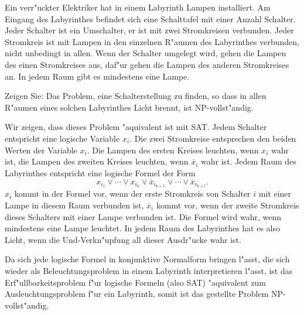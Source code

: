 Ein verr"uckter Elektriker hat in einem Labyrinth Lampen installiert.
Am Eingang des Labyrinthes befindet sich eine Schalttafel mit einer
Anzahl Schalter. Jeder Schalter ist ein Umschalter, er ist mit
zwei Stromkreisen verbunden. Jeder Stromkreis ist mit Lampen in
den einzelnen R"aumen des Labyrinthes verbunden, nicht unbedingt in
allen.
Wenn der
Schalter umgelegt wird, gehen die Lampen des einen
Stromkreises aus, daf"ur gehen die Lampen des anderen Stromkreises an.
In jedem Raum gibt es mindestens eine Lampe.

Zeigen Sie: Das Problem, eine Schalterstellung zu finden, so
dass in allen R"aumen eines solchen Labyrinthes Licht brennt,
ist NP-vollst"andig.

\begin{loesung}
Wir zeigen, dass dieses Problem "aquivalent ist mit SAT. Jedem Schalter
entspricht eine logische Variable $x_i$. Die zwei Stromkreise entsprechen
den beiden Werten der Variable $x_i$. Die Lampen des ersten Kreises leuchten,
wenn $x_i$ wahr ist, die Lampen des zweiten Kreises leuchten, wenn
$\overline x_i$ wahr ist.
Jedem Raum des Labyrinthes entspricht eine logische Formel der Form
\[
x_{i_1}\vee \cdots \vee x_{i_k}\vee \overline x_{i_{k+1}}\vee \cdots\vee \overline x_{i_{k+l}}.
\]
$x_i$ kommt in der Formel vor, wenn der erste Stromkreis von Schalter $i$
mit einer Lampe in diesem Raum verbunden ist, $\overline x_i$ kommt vor,
wenn der zweite Stromkreis dieses Schalters mit einer Lampe verbunden ist.
Die Formel wird wahr, wenn mindestens eine Lampe leuchtet. In jedem Raum
des Labyrinthes hat es also Licht, wenn die Und-Verkn"upfung all dieser
Ausdr"ucke wahr ist.

Da sich jede logische Formel in konjunktive Normalform bringen l"asst,
die sich wieder als Beleuchtungsproblem in einem Labyrinth interpretieren
l"asst, ist das Erf"ullbarkeitsproblem f"ur logische Formeln (also SAT)
"aquivalent zum Ausleuchtungsproblem f"ur ein Labyrinth, somit ist
das gestellte Problem NP-vollst"andig.
\end{loesung}
